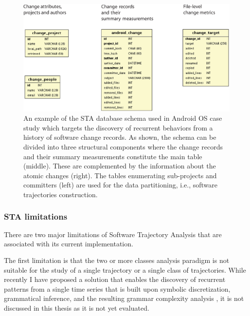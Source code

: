 \begin{figure}[t]
   \centering
   \includegraphics[width=150mm]{figures/sta-schema.eps}
   \caption[An example of the STA database schema used in Android OS case study which targets the discovery of
   recurrent behaviors from a history of software change records.]
   {An example of the STA database schema used in Android OS case study which targets the discovery of
   recurrent behaviors from a history of software change records. As shown, the schema can be divided into three 
   structural components where the change records and their summary measurements constitute the main table (middle).
   These are complemented by the information about the atomic changes (right). 
   The tables enumerating sub-projects and committers (left) are used for the data partitioning, i.e., software trajectories construction.}
   \label{fig:db-schema}
\end{figure}

\subsubsection{STA limitations}\label{sta_limitations}
There are two major limitations of Software Trajectory Analysis that are associated with its current implementation.

The first limitation is that the two or more classes analysis paradigm is not suitable for the study of a single trajectory or a single class of trajectories. While recently I have proposed a solution that enables the discovery of recurrent patterns from a single time series that is built upon symbolic discretization, grammatical inference, and the resulting grammar complexity analysis \cite{grammarviz2}, it is not discussed in this thesis as it is not yet evaluated.

